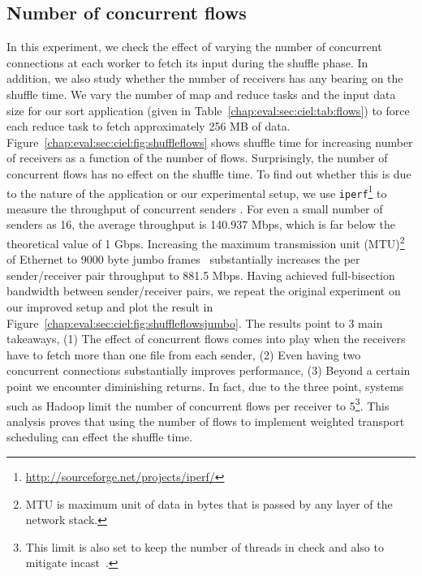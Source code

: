 \documentclass[a4paper,12pt,twoside,openright]{report}
\begin{document}
\subsection{Number of concurrent flows}
In this experiment, we check the effect of varying the number of concurrent
connections at each worker to fetch its input during the shuffle phase. In
addition, we also study whether the number of receivers has any bearing on the
shuffle time. We vary the number of map and reduce tasks and the input data size
for our sort application (given in Table~\ref{chap:eval:sec:ciel:tab:flows}) to
force each reduce task to fetch approximately 256 MB of data.
Figure~\ref{chap:eval:sec:ciel:fig:shuffleflows} shows shuffle time for
increasing number of receivers as a function of the number of flows.
Surprisingly, the number of concurrent flows has no effect on the shuffle time.
To find out whether this is due to the nature of the application or our
experimental setup, we use
\texttt{iperf}\footnote{\url{http://sourceforge.net/projects/iperf/}} to measure
the throughput of concurrent senders . For even a small number of senders as 16,
the average throughput is 140.937 Mbps, which is far below the theoretical value
of 1 Gbps. Increasing the maximum transmission unit (MTU)\footnote{MTU is
maximum unit of data in bytes that is passed by any layer of the network stack.}
of Ethernet to 9000 byte jumbo frames~\cite{Chase:2000:ESO} substantially
increases the per sender/receiver pair throughput to 881.5 Mbps. Having achieved
full-bisection bandwidth between sender/receiver pairs, we repeat the original
experiment on our improved setup and plot the result in
Figure~\ref{chap:eval:sec:ciel:fig:shuffleflowsjumbo}. The results point to 3
main takeaways, (1) The effect of concurrent flows comes into play when the
receivers have to fetch more than one file from each sender, (2) Even having two
concurrent connections substantially improves performance, (3) Beyond a certain
point we encounter diminishing returns. In fact, due to the three point, systems
such as Hadoop limit the number of concurrent flows per receiver to
5\footnote{This limit is also set to keep the number of threads in check and
also to mitigate incast~\cite{Chowdhury:2011:MDT}.}. This analysis proves that
using the number of flows to implement weighted transport scheduling can effect
the shuffle time.
\end{document}
